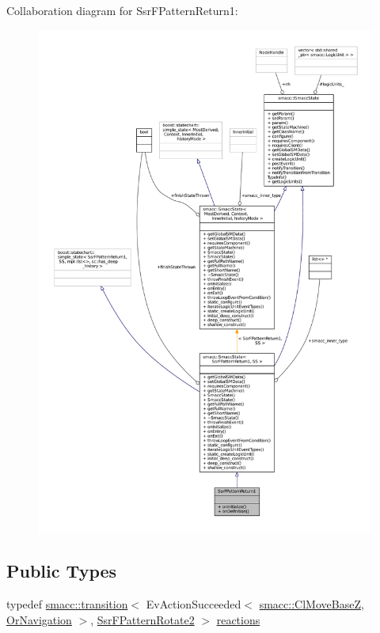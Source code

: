 Collaboration diagram for Ssr\+F\+Pattern\+Return1\+:
\nopagebreak
\begin{figure}[H]
\begin{center}
\leavevmode
\includegraphics[width=350pt]{structSsrFPatternReturn1__coll__graph}
\end{center}
\end{figure}
\subsection*{Public Types}
\begin{DoxyCompactItemize}
\item 
typedef \hyperlink{classsmacc_1_1transition}{smacc\+::transition}$<$ Ev\+Action\+Succeeded$<$ \hyperlink{classsmacc_1_1ClMoveBaseZ}{smacc\+::\+Cl\+Move\+BaseZ}, \hyperlink{classOrNavigation}{Or\+Navigation} $>$, \hyperlink{structSsrFPatternRotate2}{Ssr\+F\+Pattern\+Rotate2} $>$ \hyperlink{structSsrFPatternReturn1_a16c93380e7a96658f8164839d90c4215}{reactions}
\end{DoxyCompactItemize}
